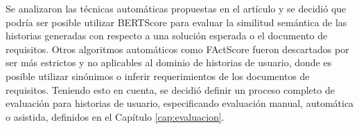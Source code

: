 Se analizaron las técnicas automáticas propuestas en el artículo y se decidió que podría ser posible utilizar BERTScore para evaluar la similitud semántica de las historias generadas con respecto a una solución esperada o el documento de requisitos. Otros algoritmos automáticos como FActScore fueron descartados por ser más estrictos y no aplicables al dominio de historias de usuario, donde es posible utilizar sinónimos o inferir requerimientos de los documentos de requisitos. Teniendo esto en cuenta, se decidió definir un proceso completo de evaluación para historias de usuario, especificando evaluación manual, automática o asistida, definidos en el Capítulo \ref{cap:evaluacion}.